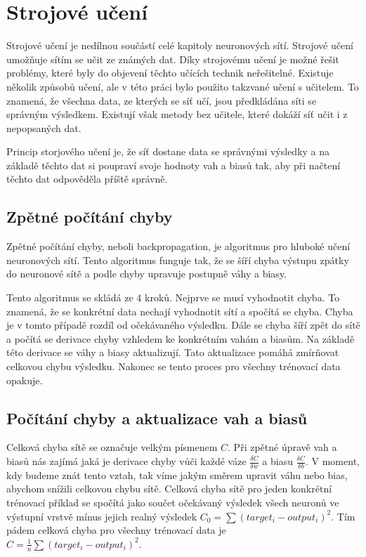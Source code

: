 \section{Strojové učení} \label{strojove_uceni}
Strojové učení je nedílnou součástí celé kapitoly neuronových sítí. Strojové učení umožňuje sítím se učit ze známých dat.
Díky strojovému učení je možné řešit problémy, které byly do objevení těchto učících technik neřešitelné.
Existuje několik způsobů učení, ale v této práci bylo použito takzvané učení s učitelem.
To znamená, že všechna data, ze kterých se síť učí, jsou předkládána síti se správným výsledkem.
Existují však metody bez učitele, které dokáží síť učit i z nepopsaných dat.

Princip storjového učení je, že síť dostane data se správnými výsledky a na základě těchto dat si poupraví svoje hodnoty vah a biasů tak,
aby při načtení těchto dat odpověděla příště správně.

\subsection{Zpětné počítání chyby}
Zpětné počítání chyby\cite{backpropagation}, neboli backpropagation, je algoritmus pro hluboké učení neuronových sítí.
Tento algoritmus funguje tak, že se šíří chyba výstupu zpátky do neuronové sítě a podle chyby upravuje postupně váhy a biasy.

Tento algoritmus se skládá ze 4 kroků. Nejprve se musí vyhodnotit chyba. To znamená, že se konkrétní data nechají vyhodnotit sítí a spočítá se chyba.
Chyba je v tomto případě rozdíl od očekávaného výsledku. Dále se chyba šíří zpět do sítě a počítá se derivace chyby vzhledem ke konkrétním vahám a biasům.
Na základě této derivace se váhy a biasy aktualizují. Tato aktualizace pomáhá zmírňovat celkovou chybu výsledku. Nakonec se tento proces pro všechny trénovací data opakuje.

\subsection{Počítání chyby a aktualizace vah a biasů}
Celková chyba sítě se označuje velkým písmenem \(C\). Při zpětné úpravě vah a biasů nás zajímá jaká je derivace chyby vůči každé váze \(\frac{\delta C}{\delta w}\) a biasu \(\frac{\delta C}{\delta b}\).
V moment, kdy budeme znát tento vztah, tak víme jakým směrem upravit váhu nebo bias, abychom snížili celkovou chybu sítě.
Celková chyba sítě pro jeden konkrétní trénovací příklad se spočítá jako součet očekávaný výsledek všech neuronů ve výstupní vrstvě mínus jejich realný výsledek \(C_0 = \sum (target_i - output_i)^2 \).
Tím pádem celková chyba pro všechny trénovací data je \(C = \frac{1}{n}\sum (target_i - output_i)^2 \).

